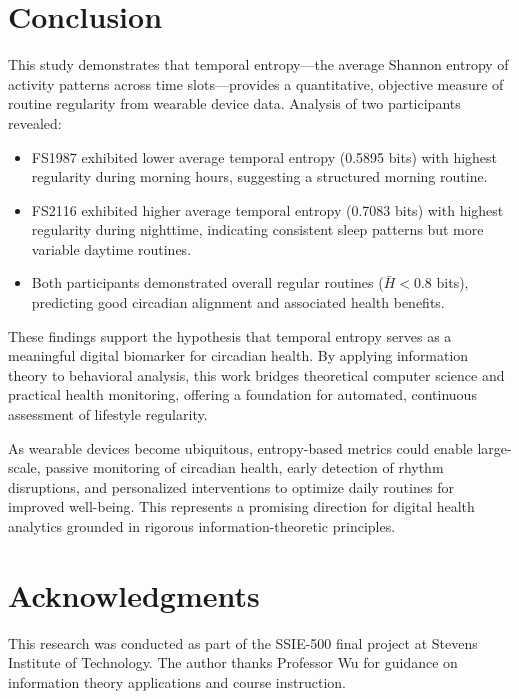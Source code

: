 \documentclass[12pt,letterpaper]{article}
\begin{document}
\section{Conclusion}

This study demonstrates that temporal entropy—the average Shannon entropy of activity patterns across time slots—provides a quantitative, objective measure of routine regularity from wearable device data. Analysis of two participants revealed:

\begin{itemize}
    \item FS1987 exhibited lower average temporal entropy (0.5895 bits) with highest regularity during morning hours, suggesting a structured morning routine.
    \item FS2116 exhibited higher average temporal entropy (0.7083 bits) with highest regularity during nighttime, indicating consistent sleep patterns but more variable daytime routines.
    \item Both participants demonstrated overall regular routines ($\bar{H} < 0.8$ bits), predicting good circadian alignment and associated health benefits.
\end{itemize}

These findings support the hypothesis that temporal entropy serves as a meaningful digital biomarker for circadian health. By applying information theory to behavioral analysis, this work bridges theoretical computer science and practical health monitoring, offering a foundation for automated, continuous assessment of lifestyle regularity.

As wearable devices become ubiquitous, entropy-based metrics could enable large-scale, passive monitoring of circadian health, early detection of rhythm disruptions, and personalized interventions to optimize daily routines for improved well-being. This represents a promising direction for digital health analytics grounded in rigorous information-theoretic principles.

\section*{Acknowledgments}

This research was conducted as part of the SSIE-500 final project at Stevens Institute of Technology. The author thanks Professor Wu for guidance on information theory applications and course instruction.
\end{document}

